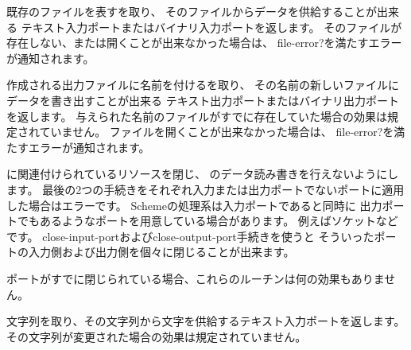 \begin{entry}{%
}
 
既存のファイルを表すを取り、
そのファイルからデータを供給することが出来る
テキスト入力ポートまたはバイナリ入力ポートを返します。
そのファイルが存在しない、または開くことが出来なかった場合は、
{\cf file-error?}を満たすエラーが通知されます。

\end{entry}


\begin{entry}{%
}

作成される出力ファイルに名前を付けるを取り、
その名前の新しいファイルにデータを書き出すことが出来る
テキスト出力ポートまたはバイナリ出力ポートを返します。
与えられた名前のファイルがすでに存在していた場合の効果は規定されていません。
ファイルを開くことが出来なかった場合は、
{\cf file-error?}を満たすエラーが通知されます。

\end{entry}


\begin{entry}{%
}

に関連付けられているリソースを閉じ、
のデータ読み書きを行えないようにします。
最後の2つの手続きをそれぞれ入力または出力ポートでないポートに適用した場合はエラーです。
Schemeの処理系は入力ポートであると同時に
出力ポートでもあるようなポートを用意している場合があります。
例えばソケットなどです。
{\cf close-input-port}および{\cf close-output-port}手続きを使うと
そういったポートの入力側および出力側を個々に閉じることが出来ます。

ポートがすでに閉じられている場合、これらのルーチンは何の効果もありません。


\end{entry}

\begin{entry}{%
}

文字列を取り、その文字列から文字を供給するテキスト入力ポートを返します。
その文字列が変更された場合の効果は規定されていません。

\end{entry}


